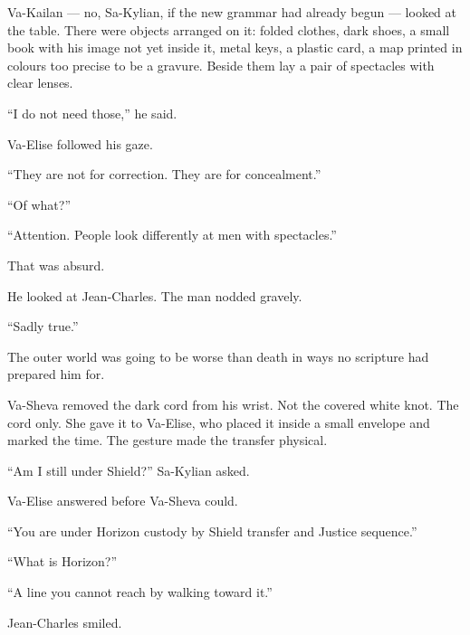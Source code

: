 Va-Kailan — no, Sa-Kylian, if the new grammar had already begun — looked at the table. There were objects arranged on it: folded clothes, dark shoes, a small book with his image not yet inside it, metal keys, a plastic card, a map printed in colours too precise to be a gravure. Beside them lay a pair of spectacles with clear lenses.\par

“I do not need those,” he said.\par

Va-Elise followed his gaze.\par

“They are not for correction. They are for concealment.”\par

“Of what?”\par

“Attention. People look differently at men with spectacles.”\par

That was absurd.\par

He looked at Jean-Charles. The man nodded gravely.\par

“Sadly true.”\par

The outer world was going to be worse than death in ways no scripture had prepared him for.\par

Va-Sheva removed the dark cord from his wrist. Not the covered white knot. The cord only. She gave it to Va-Elise, who placed it inside a small envelope and marked the time. The gesture made the transfer physical.\par

“Am I still under Shield?” Sa-Kylian asked.\par

Va-Elise answered before Va-Sheva could.\par

“You are under Horizon custody by Shield transfer and Justice sequence.”\par

“What is Horizon?”\par

“A line you cannot reach by walking toward it.”\par

Jean-Charles smiled.\par

